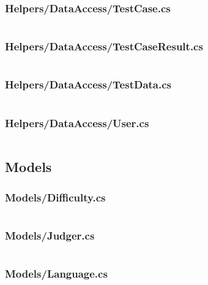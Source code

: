 \documentclass[a4paper]{report}
\begin{document}
\inputminted{csharp}{"../src/Algorithm Dynamics.Core/Helpers/DataAccess/Tag.cs"}

\subsubsection{Helpers/DataAccess/TestCase.cs}

\inputminted{csharp}{"../src/Algorithm Dynamics.Core/Helpers/DataAccess/TestCase.cs"}

\subsubsection{Helpers/DataAccess/TestCaseResult.cs}

\inputminted{csharp}{"../src/Algorithm Dynamics.Core/Helpers/DataAccess/TestCaseResult.cs"}

\subsubsection{Helpers/DataAccess/TestData.cs}

\inputminted{csharp}{"../src/Algorithm Dynamics.Core/Helpers/DataAccess/TestData.cs"}

\subsubsection{Helpers/DataAccess/User.cs}

\inputminted{csharp}{"../src/Algorithm Dynamics.Core/Helpers/DataAccess/User.cs"}

\subsection{Models}

\subsubsection{Models/Difficulty.cs}

\inputminted{csharp}{"../src/Algorithm Dynamics.Core/Models/Difficulty.cs"}

\subsubsection{Models/Judger.cs}

\inputminted{csharp}{"../src/Algorithm Dynamics.Core/Models/Judger.cs"}

\subsubsection{Models/Language.cs}
\end{document}
